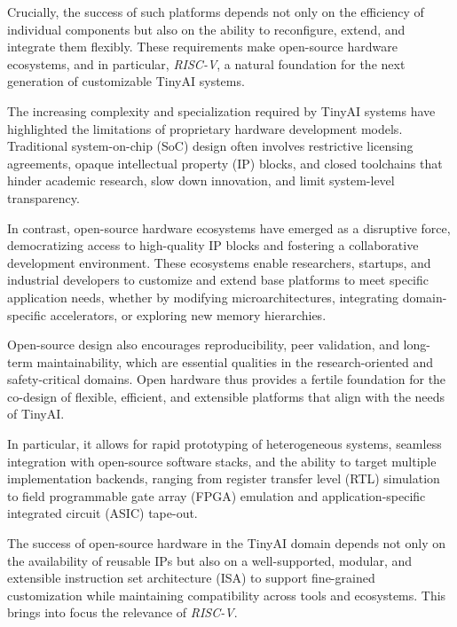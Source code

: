         Crucially, the success of such platforms depends not only on the efficiency of individual components but also on the ability to reconfigure, extend, and integrate them flexibly. These requirements make open-source hardware ecosystems, and in particular, \emph{RISC-V}, a natural foundation for the next generation of customizable TinyAI systems.
        
        The increasing complexity and specialization required by TinyAI systems have highlighted the limitations of proprietary hardware development models. Traditional system-on-chip (SoC) design often involves restrictive licensing agreements, opaque intellectual property (IP) blocks, and closed toolchains that hinder academic research, slow down innovation, and limit system-level transparency.
        
        In contrast, open-source hardware ecosystems have emerged as a disruptive force, democratizing access to high-quality IP blocks and fostering a collaborative development environment. These ecosystems enable researchers, startups, and industrial developers to customize and extend base platforms to meet specific application needs, whether by modifying microarchitectures, integrating domain-specific accelerators, or exploring new memory hierarchies.
        
        Open-source design also encourages reproducibility, peer validation, and long-term maintainability, which are essential qualities in the research-oriented and safety-critical domains. Open hardware thus provides a fertile foundation for the co-design of flexible, efficient, and extensible platforms that align with the needs of TinyAI.
        
        In particular, it allows for rapid prototyping of heterogeneous systems, seamless integration with open-source software stacks, and the ability to target multiple implementation backends, ranging from register transfer level (RTL) simulation to field programmable gate array (FPGA) emulation and application-specific integrated circuit (ASIC) tape-out.

        The success of open-source hardware in the TinyAI domain depends not only on the availability of reusable IPs but also on a well-supported, modular, and extensible instruction set architecture (ISA) to support fine-grained customization while maintaining compatibility across tools and ecosystems. This brings into focus the relevance of \emph{RISC-V}.
        

